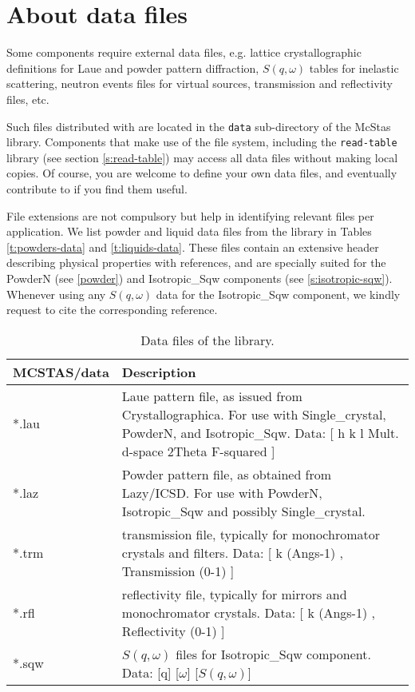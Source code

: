 \section{About data files}
Some components require external data files,
e.g. lattice crystallographic definitions for Laue and powder pattern diffraction,
$S(q,\omega)$ tables for inelastic scattering,
neutron events files for virtual sources,
transmission and reflectivity files, etc.

Such files distributed with \MCS are located in the
\verb+data+ sub-directory of the McStas library.
Components that make use of the \MCS file system,
including the \verb+read-table+ library (see section \ref{s:read-table})
may access all \MCS data files without making local copies.
Of course, you are welcome to define your own data files,
and eventually contribute to \MCS if you find them useful.

File extensions are not compulsory but help in identifying relevant files per application. We list powder and liquid data files from the \MCS library in Tables \ref{t:powders-data} and \ref{t:liquids-data}. These files contain an extensive header describing physical properties with references, and are specially suited for the PowderN (see \ref{powder}) and Isotropic\_Sqw components (see \ref{s:isotropic-sqw}). Whenever using any $S(q,\omega)$ data for the Isotropic\_Sqw component, we kindly request to cite the corresponding reference.

\begin{table}
  \begin{center}
    {\let\my=\\
    \begin{tabular}{|p{}|p{}|}
      \hline
       \textbf{MCSTAS/data} & Description \\
       \hline
 *.lau & Laue pattern file, as issued from Crystallographica.
       For use with Single\_crystal, PowderN, and Isotropic\_Sqw.
       Data: [ h   k   l Mult. d-space 2Theta   F-squared ] \\
 *.laz & Powder pattern file, as obtained from Lazy/ICSD.
       For use with PowderN, Isotropic\_Sqw and possibly Single\_crystal.\\
 *.trm & transmission file, typically for monochromator crystals and filters.
       Data: [ k (Angs-1) , Transmission (0-1) ] \\
 *.rfl & reflectivity file, typically for mirrors and monochromator crystals.
       Data: [ k (Angs-1) , Reflectivity (0-1) ] \\
 *.sqw & $S(q,\omega)$ files for Isotropic\_Sqw component.
       Data: [q] [$\omega$] [$S(q,\omega)$]\\
      \hline
    \end{tabular}
    \caption{Data files of the \MCS library.}
    \label{t:comp-data}
    }
  \end{center}
\end{table}

